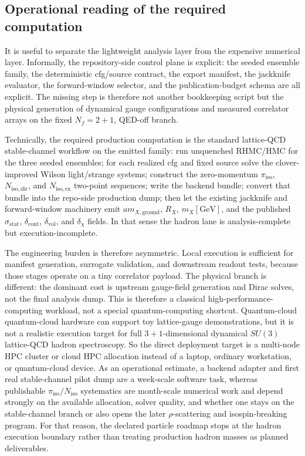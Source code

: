 \documentclass[11pt]{article}
\begin{document}
\subsection{Operational reading of the required computation}

It is useful to separate the lightweight analysis layer from the expensive numerical layer.
Informally, the repository-side control plane is explicit: the seeded ensemble family, the
deterministic cfg/source contract, the export manifest, the jackknife evaluator, the forward-window
selector, and the publication-budget schema are all explicit. The missing step is therefore not
another bookkeeping script but the physical generation of dynamical gauge configurations and
measured correlator arrays on the fixed \(N_f=2+1\), QED-off branch.

Technically, the required production computation is the standard lattice-QCD stable-channel
workflow on the emitted family: run unquenched RHMC/HMC for the three seeded ensembles; for each
realized cfg and fixed source solve the clover-improved Wilson light/strange systems; construct the
zero-momentum \(\pi_{\mathrm{iso}}\), \(N_{\mathrm{iso,dir}}\), and \(N_{\mathrm{iso,ex}}\)
two-point sequences; write the backend bundle; convert that bundle into the repo-side production
dump; then let the existing jackknife and forward-window machinery emit
\(a m_{X,\mathrm{ground}}\), \(R_X\), \(m_X[\mathrm{GeV}]\), and the published
\(\sigma_{\mathrm{stat}}\), \(\delta_{\mathrm{cont}}\), \(\delta_{\mathrm{vol}}\), and
\(\delta_{\chi}\) fields. In that sense the hadron lane is analysis-complete but
execution-incomplete.

The engineering burden is therefore asymmetric. Local execution is sufficient for manifest
generation, surrogate validation, and downstream readout tests, because those stages operate on a
tiny correlator payload. The physical branch is different: the dominant cost is upstream
gauge-field generation and Dirac solves, not the final analysis dump. This is therefore a classical
high-performance-computing workload, not a special quantum-computing shortcut. Quantum-cloud
quantum-cloud hardware can support toy lattice-gauge demonstrations, but it is not a
realistic execution target for full \(3+1\)-dimensional dynamical \(SU(3)\) lattice-QCD hadron
spectroscopy. So the direct deployment target is a multi-node HPC cluster or cloud HPC allocation
instead of a laptop, ordinary workstation, or quantum-cloud device. As an operational estimate, a backend adapter and first real stable-channel pilot dump
are a week-scale software task, whereas publishable \(\pi_{\mathrm{iso}}/N_{\mathrm{iso}}\)
systematics are month-scale numerical work and depend strongly on the available allocation, solver
quality, and whether one stays on the stable-channel branch or also opens the later
\(\rho\)-scattering and isospin-breaking program. For that reason, the declared particle roadmap
stops at the hadron execution boundary rather than treating production hadron masses as planned
deliverables.
\end{document}
